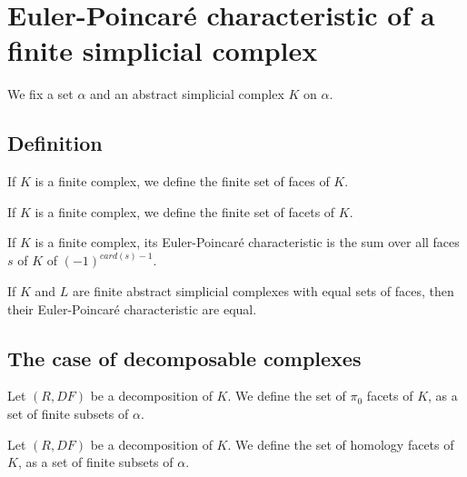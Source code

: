 \section{Euler-Poincaré characteristic of a finite simplicial complex}

We fix a set $\alpha$ and an abstract simplicial complex $K$ on $\alpha$.

\subsection{Definition}

\begin{subdefi}[FacesFinset]
If $K$ is a finite complex, we define the finite set of faces of $K$.

\end{subdefi}

\begin{subdefi}[FacetsFinset]
If $K$ is a finite complex, we define the finite set of facets of $K$.

\end{subdefi}

\begin{subdefi}[EulerPoincareCharacteristic]
If $K$ is a finite complex, its Euler-Poincaré characteristic is the sum over all faces $s$ of $K$ of
$(-1)^{card(s)-1}$.

\end{subdefi}

\begin{sublemma}
If $K$ and $L$ are finite abstract simplicial complexes with equal sets of faces, then their Euler-Poincaré
characteristic are equal.

\end{sublemma}

\subsection{The case of decomposable complexes}

\begin{subdefi}[$\pi_0$Facets]
Let $(R,DF)$ be a decomposition of $K$. We define the set of $\pi_0$ facets of $K$, as a set of finite subsets of $\alpha$.

\end{subdefi}

\begin{subdefi}[HomologyFacets]
Let $(R,DF)$ be a decomposition of $K$. We define the set of homology facets of $K$, as a set of finite subsets of $\alpha$.

\end{subdefi}

